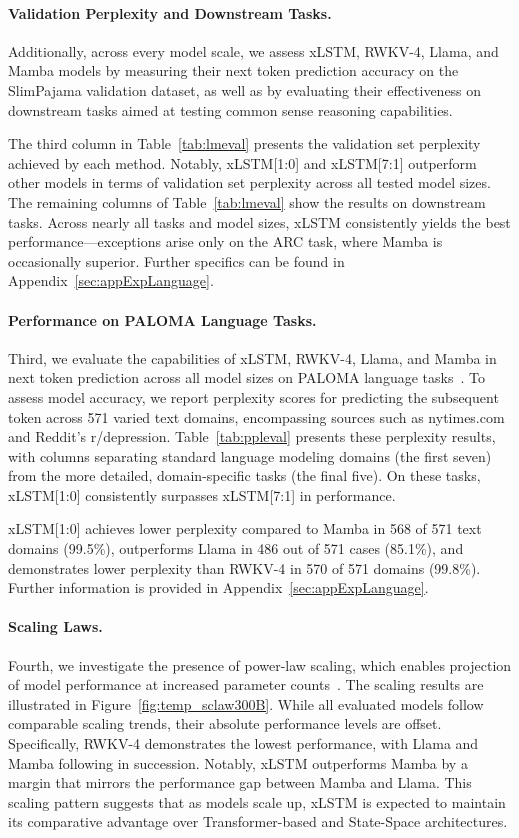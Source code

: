 \paragraph{Validation Perplexity and Downstream Tasks.}
\label{sec:spaj_downstream_eval}
Additionally, across every model scale, we assess xLSTM, RWKV-4, Llama, and Mamba models by measuring their next token prediction accuracy on the SlimPajama validation dataset, as well as by evaluating their effectiveness on downstream tasks aimed at testing common sense reasoning capabilities.

The third column in Table~\ref{tab:lmeval} presents the validation set perplexity achieved by each method. Notably, xLSTM[1:0] and xLSTM[7:1] outperform other models in terms of validation set perplexity across all tested model sizes. The remaining columns of Table~\ref{tab:lmeval} show the results on downstream tasks. Across nearly all tasks and model sizes, xLSTM consistently yields the best performance—exceptions arise only on the ARC task, where Mamba is occasionally superior. Further specifics can be found in Appendix~\ref{sec:appExpLanguage}.

\paragraph{Performance on PALOMA Language Tasks.} Third, we evaluate the capabilities of xLSTM, RWKV-4, Llama, and Mamba in next token prediction across all model sizes on PALOMA language tasks~\citep{Magnusson:23arxivshort}. To assess model accuracy, we report perplexity scores for predicting the subsequent token across 571 varied text domains, encompassing sources such as nytimes.com and Reddit's r/depression. Table~\ref{tab:ppleval} presents these perplexity results, with columns separating standard language modeling domains (the first seven) from the more detailed, domain-specific tasks (the final five). On these tasks, xLSTM[1:0] consistently surpasses xLSTM[7:1] in performance.

xLSTM[1:0] achieves lower perplexity compared to Mamba in 568 of 571 text domains (99.5\%), outperforms Llama in 486 out of 571 cases (85.1\%), and demonstrates lower perplexity than RWKV-4 in 570 of 571 domains (99.8\%). Further information is provided in Appendix~\ref{sec:appExpLanguage}.

\paragraph{Scaling Laws.} Fourth, we investigate the presence of power-law scaling, which enables projection of model performance at increased parameter counts~\citep{Kaplan:20,Brown:20short}. The scaling results are illustrated in Figure~\ref{fig:temp_sclaw300B}. While all evaluated models follow comparable scaling trends, their absolute performance levels are offset. Specifically, RWKV-4 demonstrates the lowest performance, with Llama and Mamba following in succession. Notably, xLSTM outperforms Mamba by a margin that mirrors the performance gap between Mamba and Llama. This scaling pattern suggests that as models scale up, xLSTM is expected to maintain its comparative advantage over Transformer-based and State-Space architectures.

